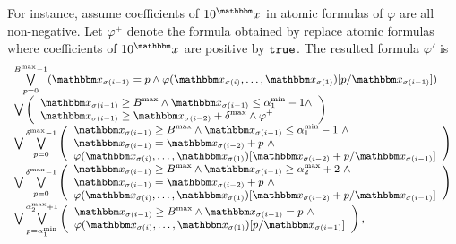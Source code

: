 {For instance, assume coefficients of $10^\ivarx$ in atomic formulas of $\varphi$ are all non-negative. Let $\varphi^+$ denote the formula obtained by replace atomic formulas where coefficients of $10^\ivarx$ are positive by $\mathtt{true}$. The resulted formula $\varphi'$ is
\[
\small
\begin{array}{l}
\bigvee \limits_{p=0}^{B^{\max}-1} ( \ivarx_{\sigma(i-1)} = p \wedge \varphi(\ivarx_{\sigma(i)}, \ldots, \ivarx_{\sigma(1)}) [p/\ivarx_{\sigma(i-1)}])   \\
\bigvee \left(
    \begin{array}{l}
        \ivarx_{\sigma(i-1)} \ge B^{\max} \wedge \ivarx_{\sigma(i-1)} \le \alpha^{\min}_1  - 1  \wedge \\
        \ivarx_{\sigma(i-1)} \ge \ivarx_{\sigma(i-2)} +\delta^{\max} \wedge \varphi^+  
    \end{array}
    \right)\\
%
\bigvee \bigvee \limits_{p=0}^{\delta^{\max}-1} 
\left(
\begin{array}{l}
\ivarx_{\sigma(i-1)} \ge B^{\max} \wedge \ivarx_{\sigma(i-1)} \le \alpha^{\min}_1  -1 \ \wedge \\
 \ivarx_{\sigma(i-1)} = \ivarx_{\sigma(i-2)} +p\ \wedge\\
 \varphi(\ivarx_{\sigma(i)}, \ldots, \ivarx_{\sigma(1)})[\ivarx_{\sigma(i-2)} + p /\ivarx_{\sigma(i-1)}] 
\end{array}
\right)\\
\bigvee \bigvee \limits_{p=0}^{\delta^{\max}-1} 
\left(
\begin{array}{l}
\ivarx_{\sigma(i-1)} \ge B^{\max} \wedge \ivarx_{\sigma(i-1)} \ge \alpha^{\max}_2 + 2 \ \wedge \\
 \ivarx_{\sigma(i-1)} = \ivarx_{\sigma(i-2)} +p\ \wedge\\
 \varphi(\ivarx_{\sigma(i)}, \ldots, \ivarx_{\sigma(1)})[\ivarx_{\sigma(i-2)} + p /\ivarx_{\sigma(i-1)}] 
\end{array}
\right)\\
\bigvee \bigvee \limits_{p = \alpha^{\min}_1}^{\alpha^{\max}_2 + 1}
\left(
\begin{array}{l}
\ivarx_{\sigma(i-1)} \ge B^{\max} \wedge \ivarx_{\sigma(i-1)} = p\ \wedge \\
 \varphi(\ivarx_{\sigma(i)}, \ldots, \ivarx_{\sigma(1)})[p /\ivarx_{\sigma(i-1)}] 
\end{array}
\right),
\end{array}
\]
}


